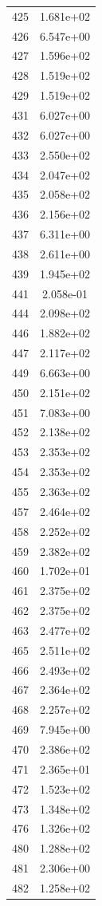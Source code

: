 \documentclass[12pt]{article}
\begin{document}
\begin{longtable}{@{}cc@{}}
425 & 1.681e+02 \\
426 & 6.547e+00 \\
427 & 1.596e+02 \\
428 & 1.519e+02 \\
429 & 1.519e+02 \\
431 & 6.027e+00 \\
432 & 6.027e+00 \\
433 & 2.550e+02 \\
434 & 2.047e+02 \\
435 & 2.058e+02 \\
436 & 2.156e+02 \\
437 & 6.311e+00 \\
438 & 2.611e+00 \\
439 & 1.945e+02 \\
441 & 2.058e-01 \\
444 & 2.098e+02 \\
446 & 1.882e+02 \\
447 & 2.117e+02 \\
449 & 6.663e+00 \\
450 & 2.151e+02 \\
451 & 7.083e+00 \\
452 & 2.138e+02 \\
453 & 2.353e+02 \\
454 & 2.353e+02 \\
455 & 2.363e+02 \\
457 & 2.464e+02 \\
458 & 2.252e+02 \\
459 & 2.382e+02 \\
460 & 1.702e+01 \\
461 & 2.375e+02 \\
462 & 2.375e+02 \\
463 & 2.477e+02 \\
465 & 2.511e+02 \\
466 & 2.493e+02 \\
467 & 2.364e+02 \\
468 & 2.257e+02 \\
469 & 7.945e+00 \\
470 & 2.386e+02 \\
471 & 2.365e+01 \\
472 & 1.523e+02 \\
473 & 1.348e+02 \\
476 & 1.326e+02 \\
480 & 1.288e+02 \\
481 & 2.306e+00 \\
482 & 1.258e+02 \\

\end{longtable}
\end{document}
